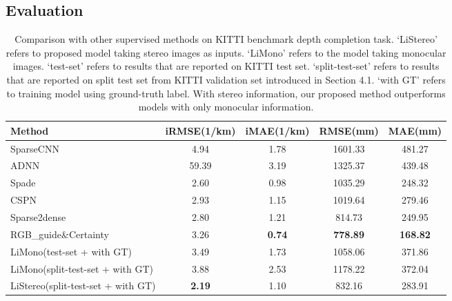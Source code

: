 \documentclass[letterpaper, 10 pt, conference]{ieeeconf}
\begin{document}
\subsection{Evaluation}
    \begin{table*}[t!]
    \begin{center}
\begin{tabular}{|l|c|c|c|c|}
    \hline
    Method & iRMSE(1/km) & iMAE(1/km) & RMSE(mm) & MAE(mm) \\
\hline\hline
    SparseCNN~\cite{sparsityCNN} & 4.94 & 1.78 & 1601.33 &	481.27\\
    ADNN~\cite{chodosh18} & 59.39 &	3.19 & 1325.37 & 439.48\\
    Spade~\cite{jaritz2018sparse} & 2.60 & 0.98 & 1035.29 & 248.32\\
    CSPN~\cite{cheng2018depth} & 2.93 & 1.15 & 1019.64 & 279.46 \\
    Sparse2dense~\cite{maSelf} & 2.80 &	1.21 &	814.73 & 249.95\\
    RGB\_guide\&Certainty~\cite{van2019sparse}& 3.26 & \textbf{0.74} & \textbf{778.89} & \textbf{168.82}\\
    \hline
    LiMono(test-set + with GT) & 3.49 & 1.73 & 1058.06 & 371.86\\
    \hline
    LiMono(split-test-set + with GT) & 3.88 & 2.53 & 1178.22 & 372.04\\
    LiStereo(split-test-set + with GT) & \textbf{2.19} & 1.10 & 832.16 & 283.91\\
    \hline
    \end{tabular}
    \end{center}
    \caption{Comparison with other supervised methods on KITTI benchmark depth completion task. `LiStereo' refers to proposed model taking stereo images as inputs. `LiMono' refers to the model taking monocular images. `test-set' refers to results that are reported on KITTI test set. `split-test-set' refers to results that are reported on split test set from KITTI validation set introduced in Section 4.1. `with GT' refers to training model using ground-truth label. With stereo information, our proposed method outperforms models with only monocular information.     }
    \label{results_kitti}
    \end{table*}
\end{document}
